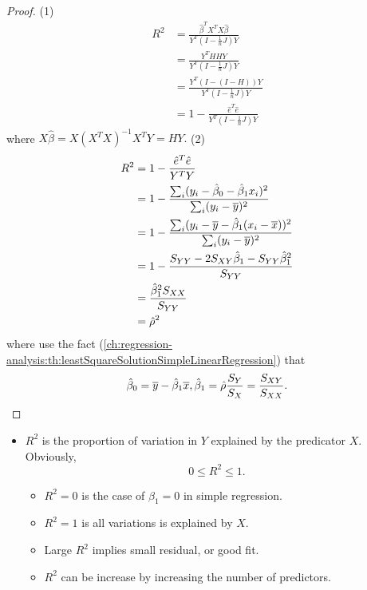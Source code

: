 \begin{refsection}
\begin{theorem}
	
\end{theorem}
\begin{proof}
(1)	
\begin{align*}
R^2 &= \frac{\hat{\beta}^T X^TX \hat{\beta}}{Y^T(I - \frac{1}{n}J)Y} \\
	&= \frac{Y^THHY}{Y^T(I - \frac{1}{n}J)Y} \\
	&= \frac{Y^T(I - (I-H))Y}{Y^T(I - \frac{1}{n}J)Y} \\
	&=  1 - \frac{\hat{e}^T\hat{e}}{Y^T(I - \frac{1}{n}J)Y}
\end{align*}	
where $X\hat{\beta} = X(X^TX)^{-1}X^TY = HY.$
(2)
\begin{align*}
R^2 &=  1 - \frac{\hat{e}^T\hat{e}}{Y^TY} \\
	&=  1 - \frac{\sum_i (y_i - \hat{\beta}_0 - \hat{\beta}_1x_i)^2}{\sum_i (y_i - \overline{y})^2} \\
	&= 1 - \frac{\sum_i (y_i - \overline{y} - \hat{\beta}_1(x_i - \overline{x}))^2}{\sum_i (y_i - \overline{y})^2} \\
	&= 1 - \frac{S_{YY} - 2S_{XY}\hat{\beta}_1 - S_{YY}\hat{\beta}_1^2}{S_{YY}} \\
	&= \frac{\hat{\beta}_1^2 S_{XX}}{S_{YY}} \\
	& = \hat{\rho}^2 
\end{align*}
where use the fact (\autoref{ch:regression-analysis:th:leastSquareSolutionSimpleLinearRegression}) that $$\hat{\beta}_0 = \overline{y} - \hat{\beta}_1\overline{x}, \hat{\beta}_1 = \hat{\rho} \frac{S_Y}{S_X} = \frac{S_{XY}}{S_{XX}}.$$
\end{proof}

\begin{remark}\hfill
	\begin{itemize}
		\item $R^2$ is  the proportion of variation in $Y$ explained by the predicator $X$. Obviously, 
		$$0\leq R^2 \leq 1.$$
		\begin{itemize}
			\item $R^2 = 0$ is the case of $\beta_1=0$ in simple regression.
			\item $R^2 = 1$ is all variations is explained by $X$.
			\item Large $R^2$ implies small residual, or good fit.
			\item $R^2$ can be increase by increasing the number of predictors. 
		\end{itemize}
	\end{itemize}
\end{remark}



\end{refsection}
